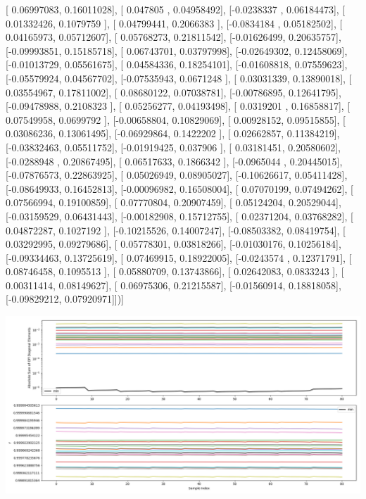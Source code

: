 \documentclass{article}
\begin{document}
       [ 0.06997083,  0.16011028],
       [ 0.047805  ,  0.04958492],
       [-0.0238337 ,  0.06184473],
       [ 0.01332426,  0.1079759 ],
       [ 0.04799441,  0.2066383 ],
       [-0.0834184 ,  0.05182502],
       [ 0.04165973,  0.05712607],
       [ 0.05768273,  0.21811542],
       [-0.01626499,  0.20635757],
       [-0.09993851,  0.15185718],
       [ 0.06743701,  0.03797998],
       [-0.02649302,  0.12458069],
       [-0.01013729,  0.05561675],
       [ 0.04584336,  0.18254101],
       [-0.01608818,  0.07559623],
       [-0.05579924,  0.04567702],
       [-0.07535943,  0.0671248 ],
       [ 0.03031339,  0.13890018],
       [ 0.03554967,  0.17811002],
       [ 0.08680122,  0.07038781],
       [-0.00786895,  0.12641795],
       [-0.09478988,  0.2108323 ],
       [ 0.05256277,  0.04193498],
       [ 0.0319201 ,  0.16858817],
       [ 0.07549958,  0.0699792 ],
       [-0.00658804,  0.10829069],
       [ 0.00928152,  0.09515855],
       [ 0.03086236,  0.13061495],
       [-0.06929864,  0.1422202 ],
       [ 0.02662857,  0.11384219],
       [-0.03832463,  0.05511752],
       [-0.01919425,  0.037906  ],
       [ 0.03181451,  0.20580602],
       [-0.0288948 ,  0.20867495],
       [ 0.06517633,  0.1866342 ],
       [-0.0965044 ,  0.20445015],
       [-0.07876573,  0.22863925],
       [ 0.05026949,  0.08905027],
       [-0.10626617,  0.05411428],
       [-0.08649933,  0.16452813],
       [-0.00096982,  0.16508004],
       [ 0.07070199,  0.07494262],
       [ 0.07566994,  0.19100859],
       [ 0.07770804,  0.20907459],
       [ 0.05124204,  0.20529044],
       [-0.03159529,  0.06431443],
       [-0.00182908,  0.15712755],
       [ 0.02371204,  0.03768282],
       [ 0.04872287,  0.1027192 ],
       [-0.10215526,  0.14007247],
       [-0.08503382,  0.08419754],
       [ 0.03292995,  0.09279686],
       [ 0.05778301,  0.03818266],
       [-0.01030176,  0.10256184],
       [-0.09334463,  0.13725619],
       [ 0.07469915,  0.18922005],
       [-0.0243574 ,  0.12371791],
       [ 0.08746458,  0.1095513 ],
       [ 0.05880709,  0.13743866],
       [ 0.02642083,  0.0833243 ],
       [ 0.00311414,  0.08149627],
       [ 0.06975306,  0.21215587],
       [-0.01560914,  0.18818058],
       [-0.09829212,  0.07920971]])]
\begin{center}
\includegraphics[scale=.9]{report_pickled_controls174/control_dpn_all.png}

\end{center}
\end{document}

